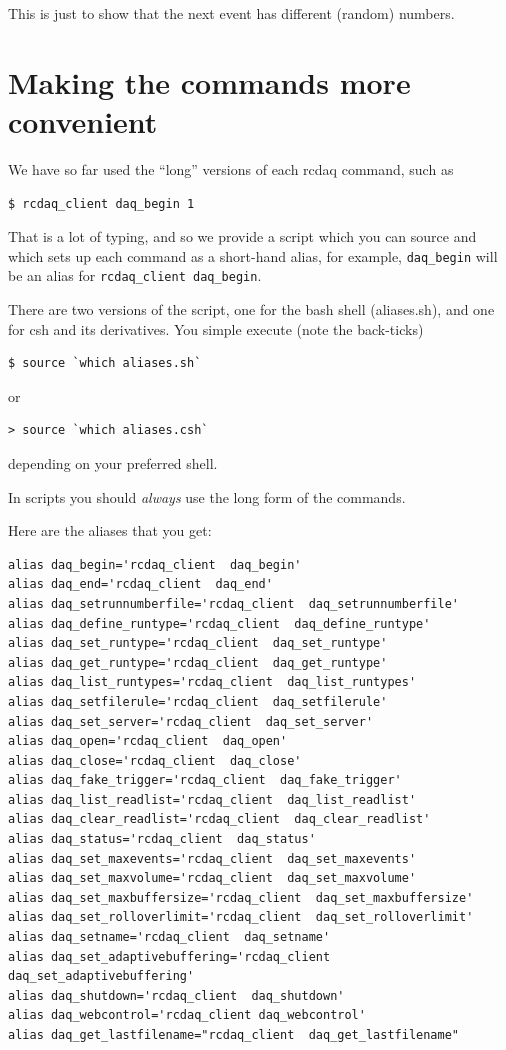 \documentclass{article}[11pt]
\begin{document}
This is just to show that the next event has different (random) numbers. 


\section{Making the commands more convenient}
\label{convenience}

We have so far used the ``long'' versions of each rcdaq command, such as

\begin{verbatim}
$ rcdaq_client daq_begin 1
\end{verbatim}

That is a lot of typing, and so we provide a script which you can source and
which sets up each command as a short-hand alias, for example,
\verb|daq_begin| will be an alias for \verb|rcdaq_client daq_begin|. 

There are two versions of the script, one for the bash shell (aliases.sh), and 
one for csh and its derivatives. You simple execute (note the back-ticks)

\begin{verbatim}
$ source `which aliases.sh`
\end{verbatim}

 or
 
\begin{verbatim}
> source `which aliases.csh`
\end{verbatim}

depending on your preferred shell. 

In scripts you should \emph{always} use the long form of the commands. 

Here are the aliases that you get:

\begin{verbatim}
alias daq_begin='rcdaq_client  daq_begin'
alias daq_end='rcdaq_client  daq_end'
alias daq_setrunnumberfile='rcdaq_client  daq_setrunnumberfile'
alias daq_define_runtype='rcdaq_client  daq_define_runtype'
alias daq_set_runtype='rcdaq_client  daq_set_runtype'
alias daq_get_runtype='rcdaq_client  daq_get_runtype'
alias daq_list_runtypes='rcdaq_client  daq_list_runtypes'
alias daq_setfilerule='rcdaq_client  daq_setfilerule'
alias daq_set_server='rcdaq_client  daq_set_server'
alias daq_open='rcdaq_client  daq_open'
alias daq_close='rcdaq_client  daq_close'
alias daq_fake_trigger='rcdaq_client  daq_fake_trigger'
alias daq_list_readlist='rcdaq_client  daq_list_readlist'
alias daq_clear_readlist='rcdaq_client  daq_clear_readlist'
alias daq_status='rcdaq_client  daq_status'
alias daq_set_maxevents='rcdaq_client  daq_set_maxevents'
alias daq_set_maxvolume='rcdaq_client  daq_set_maxvolume'
alias daq_set_maxbuffersize='rcdaq_client  daq_set_maxbuffersize'
alias daq_set_rolloverlimit='rcdaq_client  daq_set_rolloverlimit'
alias daq_setname='rcdaq_client  daq_setname'
alias daq_set_adaptivebuffering='rcdaq_client  daq_set_adaptivebuffering'
alias daq_shutdown='rcdaq_client  daq_shutdown'
alias daq_webcontrol='rcdaq_client daq_webcontrol'
alias daq_get_lastfilename="rcdaq_client  daq_get_lastfilename"
\end{verbatim}
\end{document}

